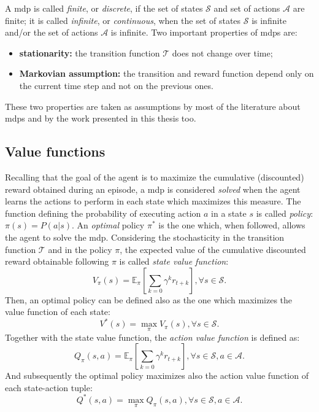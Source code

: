 A \gls{mdp} is called \textit{finite}, or \textit{discrete}, if the set of states $\mathcal{S}$ and set of actions $\mathcal{A}$ are finite; it is called \textit{infinite}, or \textit{continuous}, when the set of states $\mathcal{S}$ is infinite and/or the set of actions $\mathcal{A}$ is infinite.
Two important properties of \glspl{mdp} are:
\begin{itemize}
 \item \textbf{stationarity:} the transition function $\mathcal{T}$ does not change over time;
 \item \textbf{Markovian assumption:} the transition and reward function depend only on the current time step and not on the previous ones.
\end{itemize}
These two properties are taken as assumptions by most of the literature about \glspl{mdp} and by the work presented in this thesis too.

\subsection{Value functions}
Recalling that the goal of the agent is to maximize the cumulative (discounted) reward obtained during an episode, a \gls{mdp} is considered \textit{solved} when the agent learns the actions to perform in each state which maximizes this measure. The function defining the probability of executing action $a$ in a state $s$ is called \textit{policy}: $\pi(s) = P(a|s)$. An \textit{optimal} policy $\pi^*$ is the one which, when followed, allows the agent to solve the \gls{mdp}. Considering the stochasticity in the transition function $\mathcal{T}$ and in the policy $\pi$, the expected value of the cumulative discounted reward obtainable following $\pi$ is called \textit{state value function}:
\begin{equation}
 V_\pi(s) = \mathbb{E}_\pi[\sum_{k=0} \gamma^k r_{t+k}], \forall s \in \mathcal{S}.
\end{equation}
Then, an optimal policy can be defined also as the one which maximizes the value function of each state:
\begin{equation}
 V^*(s) = \max_\pi V_\pi(s), \forall s \in \mathcal{S}.
\end{equation}
Together with the state value function, the \textit{action value function} is defined as:
\begin{equation}
 Q_\pi(s, a) = \mathbb{E}_\pi[\sum_{k=0} \gamma^k r_{t+k}], \forall s \in \mathcal{S}, a \in \mathcal{A}.
\end{equation}
And subsequently the optimal policy maximizes also the action value function of each state-action tuple:
\begin{equation}
 Q^*(s,a) = \max_\pi Q_\pi(s,a), \forall s \in \mathcal{S}, a \in \mathcal{A}.
\end{equation}

